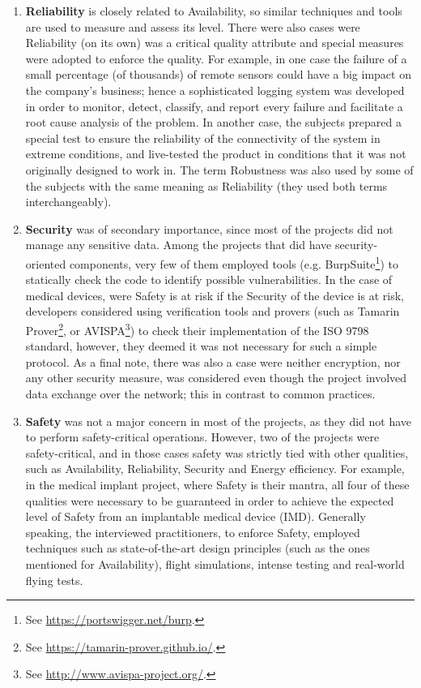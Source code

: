\begin{itemize}
\begin{enumerate}[label=\alph*)]
        \item \textbf{Reliability} is closely related to Availability, so similar techniques and tools are used to measure and assess its level.
        There were also cases were Reliability (on its own) was a critical quality attribute and special measures were adopted to enforce the quality. For example, in one case the failure of a small percentage (of thousands) of remote sensors could have a big impact on the company's business; hence a sophisticated logging system was developed in order to monitor, detect, classify, and report every failure and facilitate a root cause analysis of the problem.
        In another case, the subjects prepared a special test to ensure the reliability of the connectivity of the system in extreme conditions, and live-tested the product in conditions that it was not originally designed to work in. 
        The term Robustness was also used by some of the subjects with the same meaning as Reliability (they used both terms interchangeably).

        \item \textbf{Security} was of secondary importance, since most of the projects did not manage any sensitive data.
        Among the projects that did have security-oriented components, very few of them employed tools (e.g. BurpSuite\footnote{See \url{https://portswigger.net/burp}.}) to statically check the code to identify possible vulnerabilities.
        In the case of medical devices, were Safety is at risk if the Security of the device is at risk, developers considered using verification tools and provers (such as Tamarin Prover\footnote{See \url{https://tamarin-prover.github.io/}.}, or AVISPA\footnote{See \url{http://www.avispa-project.org/}.}) to check their implementation of the ISO 9798 standard, however, they deemed it was not necessary for such a simple protocol.
        As a final note, there was also a case were neither encryption, nor any other security measure, was considered even though the project involved data exchange over the network; this in contrast to common practices.

        \item \textbf{Safety} was not a major concern in most of the projects, as they did not have to perform safety-critical operations.
        However, two of the projects were safety-critical, and in those cases safety was strictly tied with other qualities, such as Availability, Reliability, Security and Energy efficiency.
        For example, in the medical implant project, where Safety is their mantra, all four of these qualities were necessary to be guaranteed in order to achieve the expected level of Safety from an implantable medical device (IMD).
        Generally speaking, the interviewed practitioners, to enforce Safety, employed techniques such as state-of-the-art design principles (such as the ones mentioned for Availability), flight simulations, intense testing and real-world flying tests. 
        

\end{enumerate}
\end{itemize}
